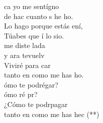 \documentclass[12pt]{article}
\begin{document}
\begin{multicols*}{2}
\begin{cancion}
\begin{chorus}
	ca yo me sentígno \\
	de hac cuanto s he ho.\\
	Lo hago porque estás ení, \\
	Túabes que í lo sio.\\
	 me diste lada \\
	y ara tevuelv\\
	Viviré para car\\
	tanto en como me has ho.\\
	ómo te podrégar?\\
	ómo ré pr?\\
	¿Cómo te podrpagar \\
	tanto en como me has hec (**)\\
	\end{chorus}%
\end{cancion}%


\end{multicols*}
\end{document}
